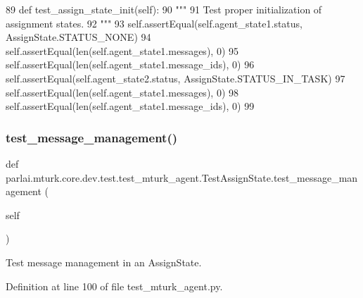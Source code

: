 \begin{DoxyCode}
89     \textcolor{keyword}{def }test\_assign\_state\_init(self):
90         \textcolor{stringliteral}{"""}
91 \textcolor{stringliteral}{        Test proper initialization of assignment states.}
92 \textcolor{stringliteral}{        """}
93         self.assertEqual(self.agent\_state1.status, AssignState.STATUS\_NONE)
94         self.assertEqual(len(self.agent\_state1.messages), 0)
95         self.assertEqual(len(self.agent\_state1.message\_ids), 0)
96         self.assertEqual(self.agent\_state2.status, AssignState.STATUS\_IN\_TASK)
97         self.assertEqual(len(self.agent\_state1.messages), 0)
98         self.assertEqual(len(self.agent\_state1.message\_ids), 0)
99 
\end{DoxyCode}
\mbox{\label{classparlai_1_1mturk_1_1core_1_1dev_1_1test_1_1test__mturk__agent_1_1TestAssignState_a5b533dedabe075d01387f1c3a7d9496e}} 
\subsubsection{\texorpdfstring{test\+\_\+message\+\_\+management()}{test\_message\_management()}}
{\footnotesize\ttfamily def parlai.\+mturk.\+core.\+dev.\+test.\+test\+\_\+mturk\+\_\+agent.\+Test\+Assign\+State.\+test\+\_\+message\+\_\+management (\begin{DoxyParamCaption}\item[{}]{self }\end{DoxyParamCaption})}

\begin{DoxyVerb}Test message management in an AssignState.
\end{DoxyVerb}
 

Definition at line 100 of file test\+\_\+mturk\+\_\+agent.\+py.


